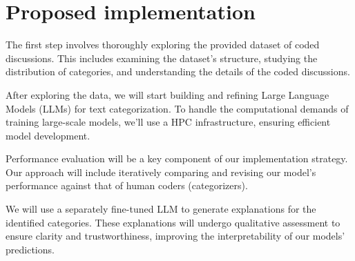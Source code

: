 \documentclass[fleqn,moreauthors,10pt]{ds_report}
\begin{document}

\section*{Proposed implementation}

The first step involves thoroughly exploring the provided dataset of coded discussions. This includes examining the dataset's structure, studying the distribution of categories, and understanding the details of the coded discussions.

After exploring the data, we will start building and refining Large Language Models (LLMs) for text categorization. To handle the computational demands of training large-scale models, we'll use a HPC infrastructure, ensuring efficient model development.

Performance evaluation will be a key component of our implementation strategy. Our approach will include iteratively comparing and revising our model's performance against that of human coders (categorizers).

We will use a separately fine-tuned LLM to generate explanations for the identified categories. These explanations will undergo qualitative assessment to ensure clarity and trustworthiness, improving the interpretability of our models' predictions.



\end{document}
